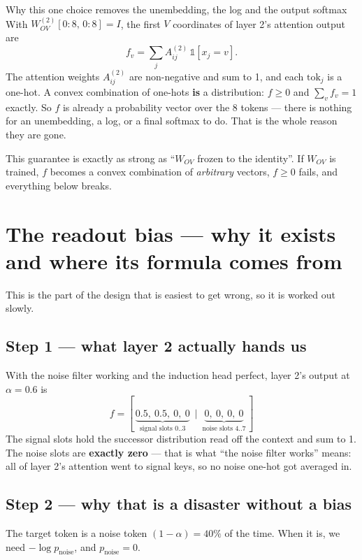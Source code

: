 \documentclass[11pt]{article}
\newcommand{\Wov}{W_{OV}}
\begin{document}
\begin{interpbox}{Why this one choice removes the unembedding, the log and the output softmax}
With $\Wov^{(2)}[0{:}8,\,0{:}8]=I$, the first $V$ coordinates of layer 2's attention output are
\[
f_v=\sum_j A^{(2)}_{ij}\,\mathbb{1}[x_j=v].
\]
The attention weights $A^{(2)}_{ij}$ are non-negative and sum to 1, and each $\text{tok}_j$ is a
one-hot. A convex combination of one-hots \textbf{is} a distribution: $f\ge0$ and $\sum_v f_v=1$
exactly. So $f$ is already a probability vector over the 8 tokens --- there is nothing for an
unembedding, a log, or a final softmax to do. That is the whole reason they are gone.

This guarantee is exactly as strong as ``$\Wov$ frozen to the identity''. If $\Wov$ is trained,
$f$ becomes a convex combination of \emph{arbitrary} vectors, $f\ge0$ fails, and everything below
breaks.
\end{interpbox}

\section{The readout bias --- why it exists and where its formula comes from}

This is the part of the design that is easiest to get wrong, so it is worked out slowly.

\subsection{Step 1 --- what layer 2 actually hands us}

With the noise filter working and the induction head perfect, layer 2's output at $\alpha=0.6$ is
\[
f=[\,\underbrace{0.5,\ 0.5,\ 0,\ 0}_{\text{signal slots }0..3}\ \mid\
\underbrace{0,\ 0,\ 0,\ 0}_{\text{noise slots }4..7}\,]
\]
The signal slots hold the successor distribution read off the context and sum to 1. The noise
slots are \textbf{exactly zero} --- that is what ``the noise filter works'' means: all of layer 2's
attention went to signal keys, so no noise one-hot got averaged in.

\subsection{Step 2 --- why that is a disaster without a bias}

The target token is a noise token $(1-\alpha)=40\%$ of the time. When it is, we need
$-\log p_{\text{noise}}$, and $p_{\text{noise}}=0$.
\end{document}
